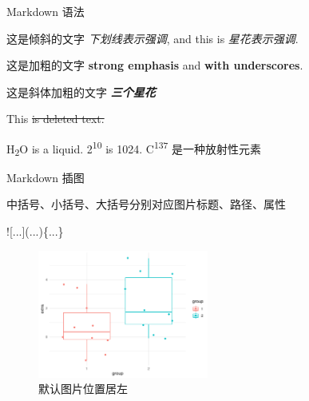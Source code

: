 \documentclass[
  ignorenonframetext,
  UTF8,fontset=adobe,zihao=false]{ctexbeamer}
\newenvironment{Shaded}{\begin{snugshade}}{\end{snugshade}}
\newcommand{\AlertTok}[1]{\textcolor[rgb]{0.94,0.16,0.16}{#1}}
\newcommand{\NormalTok}[1]{#1}
\providecommand{\tightlist}{%
  \setlength{\itemsep}{0pt}\setlength{\parskip}{0pt}}
\begin{document}
\begin{frame}{Markdown 语法}
\protect\hypertarget{sec:markdown}{}

\begin{description}
\tightlist
\item[轻微强调]
这是倾斜的文字 \emph{下划线表示强调}, and this is \emph{星花表示强调}.
\item[特别强调]
这是加粗的文字 \textbf{strong emphasis} and \textbf{with underscores}.
\item[强烈强调]
这是斜体加粗的文字 \textbf{\emph{三个星花}}
\item[删除线]
This \sout{is deleted text.}
\item[上下标]
H\textsubscript{2}O is a liquid. 2\textsuperscript{10} is 1024. C\textsuperscript{137} 是一种放射性元素
\end{description}


\end{frame}

\begin{frame}[fragile]{Markdown 插图}
\protect\hypertarget{sec:fig-markdown}{}

中括号、小括号、大括号分别对应图片标题、路径、属性

\begin{Shaded}
\begin{Highlighting}[]
\AlertTok{![...](...)}\NormalTok{\{...\}}
\end{Highlighting}
\end{Shaded}

\begin{figure}
\centering
\includegraphics[width=0.5\textwidth,height=\textheight]{beamer-verona_files/figure-beamer/sleep-1.pdf}
\caption[\label{fig:fig-markdown} 默认图片位置居左]{\label{fig:fig-markdown} 默认图片位置居左\footnotemark{}}
\end{figure}

\end{frame}
\end{document}
